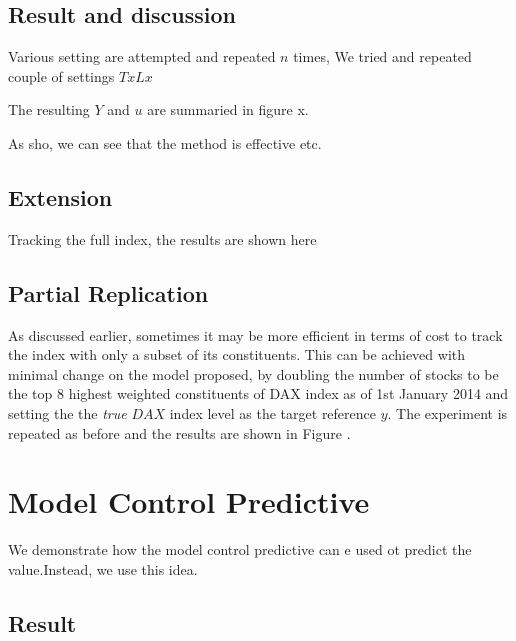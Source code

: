 \subsection{Result and discussion}
Various setting are attempted and repeated $n$ times, We tried and repeated couple of settings $T x L x $
 
The resulting $Y$ and $u$ are summaried in figure x.
 
As sho, we can see that the method is effective etc.
 
\subsection{Extension}
Tracking the full index, the results are shown here
 
\subsection{Partial Replication}
As discussed earlier, sometimes it may be more efficient in terms of cost to track the index with only a subset of its constituents. This can be achieved with minimal change on the model proposed, by doubling the number of stocks to be the top $8$ highest weighted constituents of DAX index as of 1st January 2014 and setting the the \emph{true} $DAX$ index level as the target reference $y$. The experiment is repeated as before and the results are shown in Figure .
 
\section{Model Control Predictive}
We demonstrate how the model control predictive can e used ot predict the value.Instead, we use this idea.
 
 
\subsection{Result}
 
\endinput
 
 
\section{Conclusions}
\label{sec:conclusion5}
This chapter presents some proof-of-concept experiments that have been
carried out to validate our proposal: inferring security policies from
decision examples using EAs. It first presents the experiments on
inferring some simple binary decision policies and continues with the
experiments on inferring the Fuzzy MLS model, which is a more
complicated multi-decision policy model. In all cases, the results
show that EAs are able to infer policies that can approximate (if not
refine) the original reference models that are used to generate the
training sets. The technique is also shown to be able to scale with
the range of input/output variables and to tolerate~``wrong'' examples
in the training set.
 
